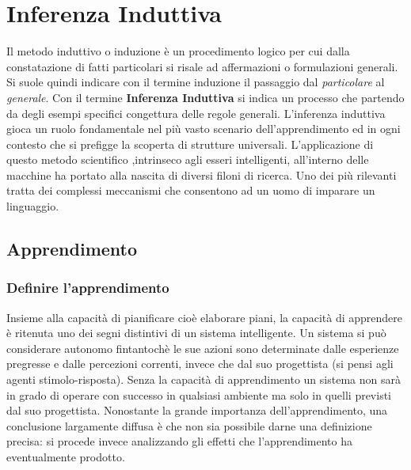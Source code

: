 
\chapter{Inferenza Induttiva} %
\label{cap:uno}

Il metodo induttivo o induzione è un procedimento logico per cui dalla constatazione di fatti particolari si risale ad affermazioni o formulazioni generali.
Si suole quindi indicare con il termine induzione  il passaggio dal \textit{particolare} al \textit{generale}.
Con il termine \textbf{Inferenza Induttiva} si indica un processo che partendo da degli esempi specifici congettura delle regole generali. L'inferenza induttiva gioca un ruolo fondamentale nel più vasto scenario dell'apprendimento ed in ogni contesto che si prefigge la scoperta di strutture universali. L'applicazione di questo metodo scientifico ,intrinseco agli esseri intelligenti, all'interno delle macchine ha portato alla nascita di diversi filoni di ricerca. Uno dei più rilevanti tratta dei complessi meccanismi che consentono ad un uomo di imparare un linguaggio. 

\section{Apprendimento}
 
\subsection{Definire l'apprendimento}
\label{sub:defapp}
Insieme alla capacità di pianificare cioè elaborare piani, la capacità di apprendere è ritenuta uno dei segni distintivi di un sistema intelligente. Un sistema si può considerare autonomo fintantochè le sue azioni sono determinate dalle esperienze pregresse e dalle percezioni correnti, invece che dal suo progettista (si pensi agli agenti stimolo-risposta). Senza la capacità di apprendimento un sistema non sarà in grado di operare con successo in qualsiasi ambiente ma solo in quelli previsti dal suo progettista. Nonostante la grande importanza dell'apprendimento, una conclusione largamente diffusa è che non sia possibile darne una definizione precisa: si procede invece analizzando gli effetti che l'apprendimento ha eventualmente prodotto.

